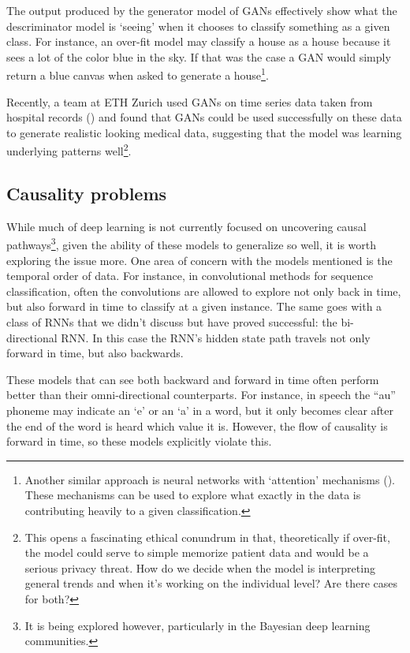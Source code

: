 \documentclass[]{book}
\let\rmarkdownfootnote\footnote%
\def\footnote{\protect\rmarkdownfootnote}
\theoremstyle{definition}
\theoremstyle{definition}
\theoremstyle{definition}
\theoremstyle{remark}
\begin{document}
The output produced by the generator model of GANs effectively show what
the descriminator model is `seeing' when it chooses to classify
something as a given class. For instance, an over-fit model may classify
a house as a house because it sees a lot of the color blue in the sky.
If that was the case a GAN would simply return a blue canvas when asked
to generate a house\footnote{Another similar approach is neural networks
  with `attention' mechanisms (\citet{attention}). These mechanisms can
  be used to explore what exactly in the data is contributing heavily to
  a given classification.}.

Recently, a team at ETH Zurich used GANs on time series data taken from
hospital records (\citet{medical_gans}) and found that GANs could be
used successfully on these data to generate realistic looking medical
data, suggesting that the model was learning underlying patterns
well\footnote{This opens a fascinating ethical conundrum in that,
  theoretically if over-fit, the model could serve to simple memorize
  patient data and would be a serious privacy threat. How do we decide
  when the model is interpreting general trends and when it's working on
  the individual level? Are there cases for both?}.

\subsection{Causality problems}\label{causality-problems}

While much of deep learning is not currently focused on uncovering
causal pathways\footnote{It is being explored however, particularly in
  the Bayesian deep learning communities.}, given the ability of these
models to generalize so well, it is worth exploring the issue more. One
area of concern with the models mentioned is the temporal order of data.
For instance, in convolutional methods for sequence classification,
often the convolutions are allowed to explore not only back in time, but
also forward in time to classify at a given instance. The same goes with
a class of RNNs that we didn't discuss but have proved successful: the
bi-directional RNN. In this case the RNN's hidden state path travels not
only forward in time, but also backwards.

These models that can see both backward and forward in time often
perform better than their omni-directional counterparts. For instance,
in speech the ``au'' phoneme may indicate an `e' or an `a' in a word,
but it only becomes clear after the end of the word is heard which value
it is. However, the flow of causality is forward in time, so these
models explicitly violate this.
\end{document}
